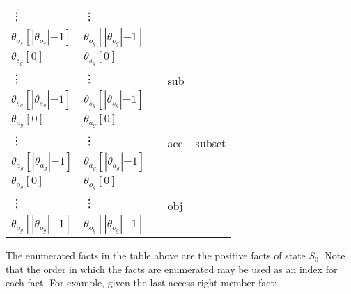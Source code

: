 \documentclass[10pt, twocolumn]{article}
\begin{document}
\begin{tabular}[t]{|l|l|l|l|l|}
            \vdots & \vdots & & & \\
            ${\theta}_{o_s}[|{\theta}_{o_s}|{-1}]$ & ${\theta}_{o_g}[|{\theta}_{o_g}|{-1}]$ & & & \\
            \hline
            ${\theta}_{s_g}[0]$ &
            ${\theta}_{s_g}[0]$ &
            &
            \multirow{3}{*}{\begin{sideways}sub\end{sideways}} &
            \multirow{9}{*}{\begin{sideways}subset\end{sideways}} \\
            \vdots & \vdots & & & \\
            ${\theta}_{s_g}[|{\theta}_{s_g}|{-1}]$ & ${\theta}_{s_g}[|{\theta}_{s_g}|{-1}]$ & & & \\
            \cline{1-4}
            ${\theta}_{a_g}[0]$ &
            ${\theta}_{a_g}[0]$ &
            &
            \multirow{3}{*}{\begin{sideways}acc\end{sideways}} & \\
            \vdots & \vdots & & & \\
            ${\theta}_{a_g}[|{\theta}_{a_g}|{-1}]$ & ${\theta}_{a_g}[|{\theta}_{a_g}|{-1}]$ & & & \\
            \cline{1-4}
            ${\theta}_{o_g}[0]$ &
            ${\theta}_{o_g}[0]$ &
            &
            \multirow{3}{*}{\begin{sideways}obj\end{sideways}} & \\
            \vdots & \vdots & & & \\
            ${\theta}_{o_g}[|{\theta}_{o_g}|{-1}]$ & ${\theta}_{o_g}[|{\theta}_{o_g}|{-1}]$ & & & \\
            \hline
          \end{tabular}

          The enumerated facts in the table above are the positive facts of
          state $S_{0}$. Note that the order in which the facts are enumerated
          may be used as an index for each fact. For example, given the last
          access right member fact:
\end{document}
